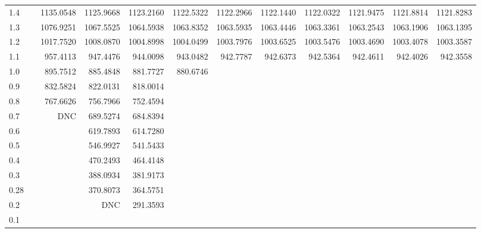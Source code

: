\begin{landscape}
\begin{table}
\begin{small}
\begin{center}
\begin{tabular}{l|rrrrrrrrrrr}
1.4 & 			& 1135.0548 & 1125.9668 & 1123.2160 & 1122.5322 & 1122.2966 & 1122.1440 & 1122.0322 & 1121.9475 & 1121.8814 & 1121.8283 \\ 
1.3 & 			& 1076.9251 & 1067.5525 & 1064.5938 & 1063.8352 & 1063.5935 & 1063.4446 & 1063.3361 & 1063.2543 & 1063.1906 & 1063.1395 \\ 
1.2 & 			& 1017.7520 & 1008.0870 & 1004.8998 & 1004.0499 & 1003.7976 & 1003.6525 & 1003.5476 & 1003.4690 & 1003.4078 & 1003.3587 \\ 
1.1 & 			&  957.4113 &  947.4476 &  944.0098 &  943.0482 &  942.7787 &  942.6373 &  942.5364 &  942.4611 &  942.4026 &  942.3558 \\ 
1.0 & 			&  895.7512 &  885.4848 &  881.7727 &  880.6746 &    \\ 
0.9 & 			&  832.5824 &  822.0131 &  818.0014 &   \\ 
0.8 & 			&  767.6626 &  756.7966 &  752.4594  \\ 
0.7 & 			&       DNC &  689.5274 &  684.8394  \\ 
0.6 & 			& 			& 619.7893 & 614.7280  \\ 
0.5 & 			& 			& 546.9927 & 541.5433  \\ 
0.4 & 			& 			& 470.2493 & 464.4148  \\ 
0.3 & 			& 			& 388.0934 & 381.9173  \\ 
0.28 & 			& 			& 370.8073 & 364.5751  \\ 
0.2 & 			& 			& DNC & 291.3593  \\ 
0.1 & 			& 			& 			&  \\ 
\hline \hline
\end{tabular}
\end{center}
\end{small}
\end{table}
\end{landscape}


